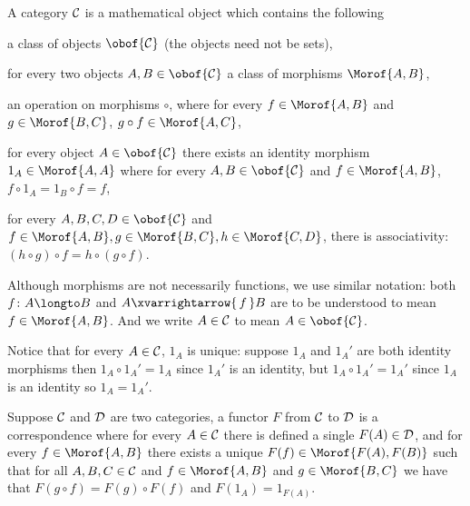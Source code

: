 \bdefn

    A {\emphcolor category} ${\cal C}$ is a mathematical object which contains the following
    \benum
        \item a class of objects $\obof{\cal C}$ (the objects need not be sets),
        \item for every two objects $A,B\in\obof{\cal C}$ a class of {\emphcolor morphisms} $\Morof{A,B}$,
        \item an operation on morphisms $\circ$, where for every $f\in\Morof{A,B}$ and $g\in\Morof{B,C}$, $g\circ f\in\Morof{A,C}$,
        \item for every object $A\in\obof{\cal C}$ there exists an identity morphism $1_A\in\Morof{A,A}$ where for every $A,B\in\obof{\cal C}$ and $f\in\Morof{A,B}$, $f\circ 1_A=1_B\circ f=f$,
        \item for every $A,B,C,D\in\obof{\cal C}$ and $f\in\Morof{A,B},g\in\Morof{B,C},h\in\Morof{C,D}$, there is associativity: $(h\circ g)\circ f=h\circ (g\circ f)$.
    \eenum

\edefn

Although morphisms are not necessarily functions, we use similar notation: both $f\colon A\longto B$ and $A\xvarrightarrow{\,f\,}B$ are to be understood to mean $f\in\Morof{A,B}$.
And we write $A\in{\cal C}$ to mean $A\in\obof{\cal C}$.

Notice that for every $A\in{\cal C}$, $1_A$ is unique: suppose $1_A$ and $1_A'$ are both identity morphisms then $1_A\circ1_A'=1_A$ since $1_A'$ is an identity, but $1_A\circ1_A'=1_A'$ since $1_A$ is an
identity so $1_A=1_A'$.

\bdefn

    Suppose ${\cal C}$ and ${\cal D}$ are two categories, a {\emphcolor functor} $F$ from ${\cal C}$ to ${\cal D}$ is a correspondence where for every $A\in{\cal C}$ there is defined a single
    $F(A)\in{\cal D}$, and for every $f\in\Morof{A,B}$ there exists a unique $F(f)\in\Morof{F(A),F(B)}$ such that for all $A,B,C\in{\cal C}$ and $f\in\Morof{A,B}$ and $g\in\Morof{B,C}$ we have that
    $F(g\circ f)=F(g)\circ F(f)$ and $F(1_A)=1_{F(A)}$.

\edefn

\bexam

